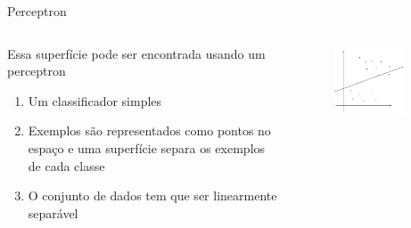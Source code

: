 \documentclass{beamer}
\begin{document}
\begin{frame}{Perceptron}
\begin{columns}
    \begin{column}{.49\textwidth}
    Essa superfície pode ser encontrada usando um perceptron
      \begin{enumerate}
      \item {
        Um classificador simples
      }
      \item {
        Exemplos são representados como pontos no espaço e uma superfície separa os exemplos de cada classe
      }
      \item {
        O conjunto de dados tem que ser linearmente separável
      }
      \end{enumerate}
    \end{column}
    \begin{column}{.49\textwidth}
    \begin{figure}
      \centering
      \includegraphics[width=0.8\textwidth]{perceptron_2.png}
    \end{figure}
    \end{column}
\end{columns}
\end{frame}
\end{document}

